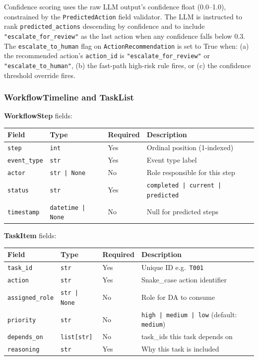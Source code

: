 \documentclass[12pt,a4paper]{article}
\begin{document}
Confidence scoring uses the raw LLM output's confidence float (0.0--1.0), constrained
by the \texttt{PredictedAction} field validator. The LLM is instructed to rank
\texttt{predicted\_actions} descending by confidence and to include
\texttt{"escalate\_for\_review"} as the last action when any confidence falls below 0.3.
The \texttt{escalate\_to\_human} flag on \texttt{ActionRecommendation} is set to True
when: (a) the recommended action's \texttt{action\_id} is \texttt{"escalate\_for\_review"}
or \texttt{"escalate\_to\_human"}, (b) the fast-path high-risk rule fires, or (c) the
confidence threshold override fires.

\subsubsection{WorkflowTimeline and TaskList}

\textbf{WorkflowStep} fields:
\begin{center}
\begin{tabular}{@{}llll@{}}
\toprule
\textbf{Field} & \textbf{Type} & \textbf{Required} & \textbf{Description} \\
\midrule
\texttt{step} & \texttt{int} & Yes & Ordinal position (1-indexed) \\
\texttt{event\_type} & \texttt{str} & Yes & Event type label \\
\texttt{actor} & \texttt{str | None} & No & Role responsible for this step \\
\texttt{status} & \texttt{str} & Yes & \texttt{completed | current | predicted} \\
\texttt{timestamp} & \texttt{datetime | None} & No & Null for predicted steps \\
\bottomrule
\end{tabular}
\end{center}

\textbf{TaskItem} fields:
\begin{center}
\begin{tabular}{@{}llll@{}}
\toprule
\textbf{Field} & \textbf{Type} & \textbf{Required} & \textbf{Description} \\
\midrule
\texttt{task\_id} & \texttt{str} & Yes & Unique ID e.g.\ \texttt{T001} \\
\texttt{action} & \texttt{str} & Yes & Snake\_case action identifier \\
\texttt{assigned\_role} & \texttt{str | None} & No & Role for DA to consume \\
\texttt{priority} & \texttt{str} & No & \texttt{high | medium | low} (default: \texttt{medium}) \\
\texttt{depends\_on} & \texttt{list[str]} & No & task\_ids this task depends on \\
\texttt{reasoning} & \texttt{str} & Yes & Why this task is included \\
\bottomrule
\end{tabular}
\end{center}
\end{document}
